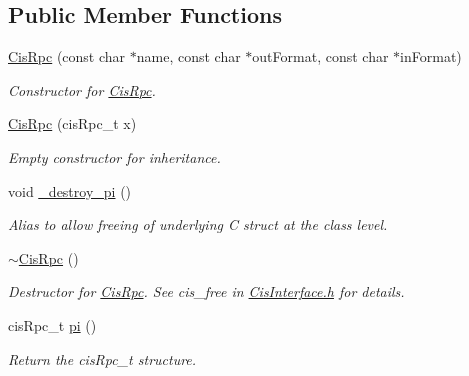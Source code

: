\subsection*{Public Member Functions}
\begin{DoxyCompactItemize}
\item 
\mbox{\hyperlink{classCisRpc_a91e65146ad3b4d1a3999835003b1cf37}{Cis\+Rpc}} (const char $\ast$name, const char $\ast$out\+Format, const char $\ast$in\+Format)
\begin{DoxyCompactList}\small\item\em Constructor for \mbox{\hyperlink{classCisRpc}{Cis\+Rpc}}. \end{DoxyCompactList}\item 
\mbox{\label{classCisRpc_aca7fcde600dcb7b42ef93a5e9405358b}} 
\mbox{\hyperlink{classCisRpc_aca7fcde600dcb7b42ef93a5e9405358b}{Cis\+Rpc}} (cis\+Rpc\+\_\+t x)
\begin{DoxyCompactList}\small\item\em Empty constructor for inheritance. \end{DoxyCompactList}\item 
\mbox{\label{classCisRpc_a29148e3e2924edc61aeec247ed939161}} 
void \mbox{\hyperlink{classCisRpc_a29148e3e2924edc61aeec247ed939161}{\+\_\+destroy\+\_\+pi}} ()
\begin{DoxyCompactList}\small\item\em Alias to allow freeing of underlying C struct at the class level. \end{DoxyCompactList}\item 
\mbox{\label{classCisRpc_accbcccd1fd223660be6e8cf54cace2a8}} 
\mbox{\hyperlink{classCisRpc_accbcccd1fd223660be6e8cf54cace2a8}{$\sim$\+Cis\+Rpc}} ()
\begin{DoxyCompactList}\small\item\em Destructor for \mbox{\hyperlink{classCisRpc}{Cis\+Rpc}}. See cis\+\_\+free in \mbox{\hyperlink{CisInterface_8h_source}{Cis\+Interface.\+h}} for details. \end{DoxyCompactList}\item 
cis\+Rpc\+\_\+t \mbox{\hyperlink{classCisRpc_ac58fc44e28ea378a1ef6b12684371aef}{pi}} ()
\begin{DoxyCompactList}\small\item\em Return the cis\+Rpc\+\_\+t structure. \end{DoxyCompactList}\item 

\end{DoxyCompactItemize}
